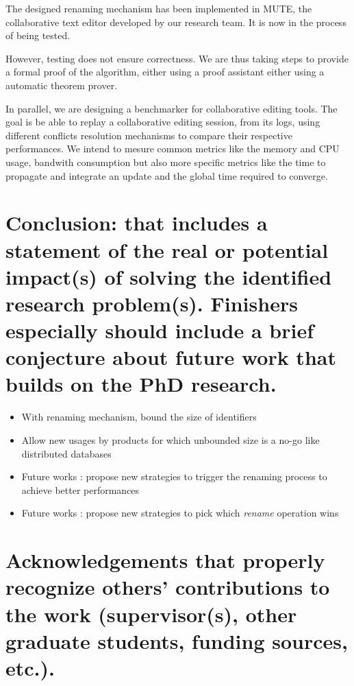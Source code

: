 \documentclass{article}
\begin{document}
The designed renaming mechanism has been implemented in MUTE, the collaborative text editor developed by our research team.
It is now in the process of being tested.

However, testing does not ensure correctness.
We are thus taking steps to provide a formal proof of the algorithm, either using a proof assistant either using a automatic theorem prover.

In parallel, we are designing a benchmarker for collaborative editing tools.
The goal is be able to replay a collaborative editing session, from its logs, using different conflicts resolution mechanisms to compare their respective performances.
We intend to mesure common metrics like the memory and CPU usage, bandwith consumption but also more specific metrics like the time to propagate and integrate an update and the global time required to converge.

\section{Conclusion: that includes a statement of the real or potential impact(s) of solving the identified research problem(s). Finishers especially should include a brief conjecture about future work that builds on the PhD research.}

\begin{itemize}
    \item With renaming mechanism, bound the size of identifiers
    \item Allow new usages by products for which unbounded size is a no-go like distributed databases
    \item Future works : propose new strategies to trigger the renaming process to achieve better performances
    \item Future works : propose new strategies to pick which \emph{rename} operation wins
\end{itemize}

\section{Acknowledgements that properly recognize others’ contributions to the work (supervisor(s), other graduate students, funding sources, etc.).}
\end{document}
